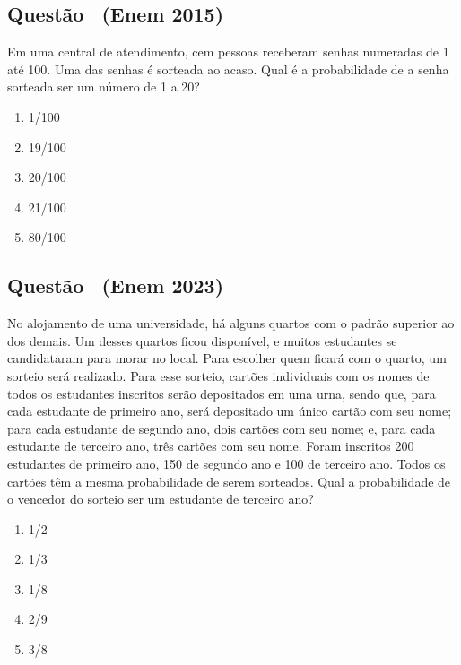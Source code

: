 \documentclass[12pt]{article}
\newif\ifmostravermelho
\newcounter{questao}
\newcommand{\novaquestao}[1]{%
  \stepcounter{questao}%
  \subsection*{Questão \thequestao\ (#1)}%
}
\begin{document}
    \begin{multicols}{2}
        \raggedcolumns
        
        \novaquestao{Enem 2015}
            Em uma central de atendimento, cem pessoas receberam senhas numeradas de 1 até 100. 
            Uma das senhas é sorteada ao acaso. Qual é a probabilidade de a senha sorteada ser um 
            número de 1 a 20?
            
            \begin{enumerate}[label=(\alph*), noitemsep]
                \item {1}/{100}
                \item {19}/{100}
                \item {20}/{100} %
                \item {21}/{100} 
                \item {80}/{100}
            \end{enumerate}

        \novaquestao{Enem 2023}

            No alojamento de uma universidade, há alguns quartos com o padrão superior ao 
            dos demais. Um desses quartos ficou disponível, e muitos estudantes se candidataram
            para morar no local. Para escolher quem ficará com o quarto, um sorteio será 
            realizado. Para esse sorteio, cartões individuais com os nomes de todos os 
            estudantes inscritos serão depositados em uma urna, sendo que, para cada estudante
            de primeiro ano, será depositado um único cartão com seu nome; para cada estudante
            de segundo ano, dois cartões com seu nome; e, para cada estudante de terceiro ano,
            três cartões com seu nome. Foram inscritos 200 estudantes de primeiro ano, 150 de 
            segundo ano e 100 de terceiro ano. Todos os cartões têm a mesma probabilidade de 
            serem sorteados. Qual a probabilidade de o vencedor do sorteio ser um estudante 
            de terceiro ano?

            \begin{enumerate}[label=(\alph*), noitemsep]
                \item {1}/{2}
                \item {1}/{3}
                \item {1}/{8}
                \item {2}/{9}
                \item {3}/{8}
            \end{enumerate}
        

\end{multicols}
\end{document}
